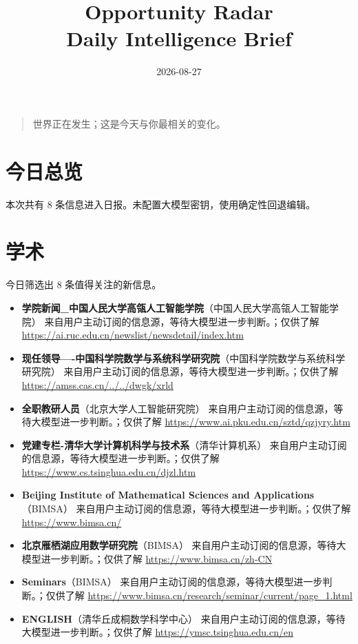 \documentclass[11pt]{ctexart}
\title{Opportunity Radar\\Daily Intelligence Brief}
\date{2026-08-27}
\begin{document}
\maketitle
\begin{quote}\Large 世界正在发生；这是今天与你最相关的变化。\end{quote}
\section*{今日总览}
本次共有 8 条信息进入日报。未配置大模型密钥，使用确定性回退编辑。
\section*{学术}
今日筛选出 8 条值得关注的新信息。
\begin{itemize}
\item \textbf{学院新闻\_中国人民大学高瓴人工智能学院}（中国人民大学高瓴人工智能学院） 来自用户主动订阅的信息源，等待大模型进一步判断。；仅供了解 \url{https://ai.ruc.edu.cn/newslist/newsdetail/index.htm}
\item \textbf{现任领导----中国科学院数学与系统科学研究院}（中国科学院数学与系统科学研究院） 来自用户主动订阅的信息源，等待大模型进一步判断。；仅供了解 \url{https://amss.cas.cn/../../dwgk/xrld}
\item \textbf{全职教研人员}（北京大学人工智能研究院） 来自用户主动订阅的信息源，等待大模型进一步判断。；仅供了解 \url{https://www.ai.pku.edu.cn/sztd/qzjyry.htm}
\item \textbf{党建专栏-清华大学计算机科学与技术系}（清华计算机系） 来自用户主动订阅的信息源，等待大模型进一步判断。；仅供了解 \url{https://www.cs.tsinghua.edu.cn/djzl.htm}
\item \textbf{Beijing Institute of Mathematical Sciences and Applications}（BIMSA） 来自用户主动订阅的信息源，等待大模型进一步判断。；仅供了解 \url{https://www.bimsa.cn/}
\item \textbf{北京雁栖湖应用数学研究院}（BIMSA） 来自用户主动订阅的信息源，等待大模型进一步判断。；仅供了解 \url{https://www.bimsa.cn/zh-CN}
\item \textbf{Seminars}（BIMSA） 来自用户主动订阅的信息源，等待大模型进一步判断。；仅供了解 \url{https://www.bimsa.cn/research/seminar/current/page_1.html}
\item \textbf{ENGLISH}（清华丘成桐数学科学中心） 来自用户主动订阅的信息源，等待大模型进一步判断。；仅供了解 \url{https://ymsc.tsinghua.edu.cn/en}
\end{itemize}
\end{document}
